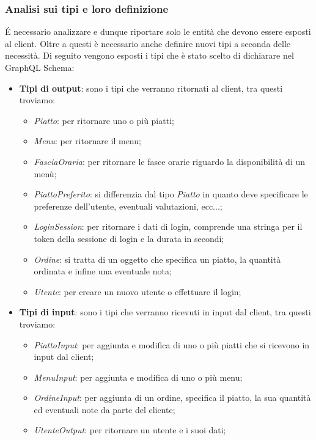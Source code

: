 \subsubsection*{Analisi sui tipi e loro definizione}
É necessario analizzare e dunque riportare solo le entità che devono essere esposti al client. Oltre a questi è necessario anche definire nuovi tipi a seconda delle necessità. Di seguito vengono esposti i tipi che è stato scelto di dichiarare nel GraphQL Schema:
\begin{itemize}
  \item \textbf{Tipi di output}: sono i tipi che verranno ritornati al client, tra questi troviamo:
  \begin{itemize}
    \item \textit{Piatto}: per ritornare uno o più piatti;
    \item \textit{Menu}: per ritornare il menu;
    \item \textit{FasciaOraria}: per ritornare le fasce orarie riguardo la disponibilità di un menù;
    \item \textit{PiattoPreferito}: si differenzia dal tipo \textit{Piatto} in quanto deve specificare le preferenze dell'utente, eventuali valutazioni, ecc...;
    \item \textit{LoginSession}: per ritornare i dati di login, comprende una stringa per il token della sessione di login e la durata in secondi;
    \item \textit{Ordine}: si tratta di un oggetto che specifica un piatto, la quantità ordinata e infine una eventuale nota;
    \item \textit{Utente}: per creare un nuovo utente o effettuare il login;
  \end{itemize}
  \item \textbf{Tipi di input}: sono i tipi che verranno ricevuti in input dal client, tra questi troviamo:
  \begin{itemize}
    \item \textit{PiattoInput}: per aggiunta e modifica di uno o più piatti che si ricevono in input dal client;
    \item \textit{MenuInput}: per aggiunta e modifica di uno o più menu;
    \item \textit{OrdineInput}: per aggiunta di un ordine, specifica il piatto, la sua quantità ed eventuali note da parte del cliente;
    \item \textit{UtenteOutput}: per ritornare un utente e i suoi dati;
  \end{itemize}
\end{itemize}
